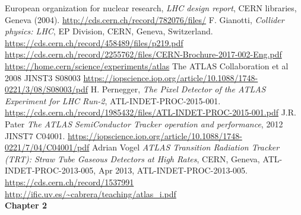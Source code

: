 \documentclass[a4paper, oneside]{book}
\begin{document}
	\begin{thebibliography}{17}
			
			
			 European organization for nuclear research, \textit{LHC design report}, CERN libraries, Geneva (2004). \url{http://cds.cern.ch/record/782076/files/}
			 F. Gianotti, \textit{Collider physics: LHC}, EP Division, CERN, Geneva, Switzerland. \url{https://cds.cern.ch/record/458489/files/p219.pdf}
			 \url{https://cds.cern.ch/record/2255762/files/CERN-Brochure-2017-002-Eng.pdf}
			 \url{https://home.cern/science/experiments/atlas}
			  The ATLAS Collaboration et al 2008 JINST3 S08003
			\url{https://iopscience.iop.org/article/10.1088/1748-0221/3/08/S08003/pdf}
			 H. Pernegger, \textit{The Pixel Detector of the ATLAS Experiment for LHC Run-2}, ATL-INDET-PROC-2015-001. \url{https://cds.cern.ch/record/1985432/files/ATL-INDET-PROC-2015-001.pdf}
			 J.R. Pater \textit{The ATLAS SemiConductor Tracker operation and performance}, 2012 JINST7 C04001. \url{https://iopscience.iop.org/article/10.1088/1748-0221/7/04/C04001/pdf}
			 Adrian Vogel \textit{ATLAS Transition Radiation Tracker (TRT): Straw Tube Gaseous Detectors at High Rates}, CERN,
			Geneva, ATL-INDET-PROC-2013-005, Apr 2013, ATL-INDET-PROC-2013-005. \url{https://cds.cern.ch/record/1537991}
			\url{http://ific.uv.es/~cabrera/teaching/atlas_i.pdf}\\
			
		 	\textbf{\Large Chapter 2} 
		 	

\end{thebibliography}
\end{document}
